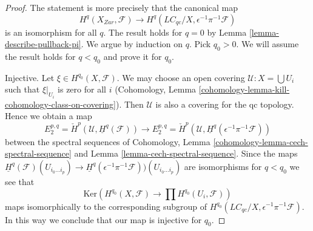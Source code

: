 \begin{proof}
The statement is more precisely that the canonical map
$$
H^q(X_{Zar}, \mathcal{F}) \longrightarrow
H^q(\textit{LC}_{qc}/X, \epsilon^{-1}\pi^{-1}\mathcal{F})
$$
is an isomorphism for all $q$.
The result holds for $q = 0$ by Lemma \ref{lemma-describe-pullback-pi}.
We argue by induction on $q$. Pick $q_0 > 0$. We will assume the result
holds for $q < q_0$ and prove it for $q_0$.

\medskip\noindent
Injective. Let $\xi \in H^{q_0}(X, \mathcal{F})$. We may choose an open
covering $\mathcal{U} : X = \bigcup U_i$ such that $\xi|_{U_i}$ is zero
for all $i$
(Cohomology, Lemma \ref{cohomology-lemma-kill-cohomology-class-on-covering}).
Then $\mathcal{U}$ is also a covering for the qc topology.
Hence we obtain a map
$$
E_2^{p, q} = \check{H}^p(\mathcal{U}, \underline{H}^q(\mathcal{F}))
\longrightarrow
E_2^{p, q} =
\check{H}^p(\mathcal{U}, \underline{H}^q(\epsilon^{-1}\pi^{-1}\mathcal{F}))
$$
between the spectral sequences of
Cohomology, Lemma \ref{cohomology-lemma-cech-spectral-sequence} and
Lemma \ref{lemma-cech-spectral-sequence}.
Since the maps
$\underline{H}^q(\mathcal{F})(U_{i_0 \ldots i_p}) \to
\underline{H}^q(\epsilon^{-1}\pi^{-1}\mathcal{F}))(U_{i_0 \ldots i_p})$
are isomorphisms for $q < q_0$ we see that
$$
\text{Ker}(H^{q_0}(X, \mathcal{F}) \to \prod H^{q_0}(U_i, \mathcal{F}))
$$
maps isomorphically to the corresponding subgroup of
$H^{q_0}(\textit{LC}_{qc}/X, \epsilon^{-1}\pi^{-1}\mathcal{F})$.
In this way we conclude that our map is injective for $q_0$.


\end{proof}
